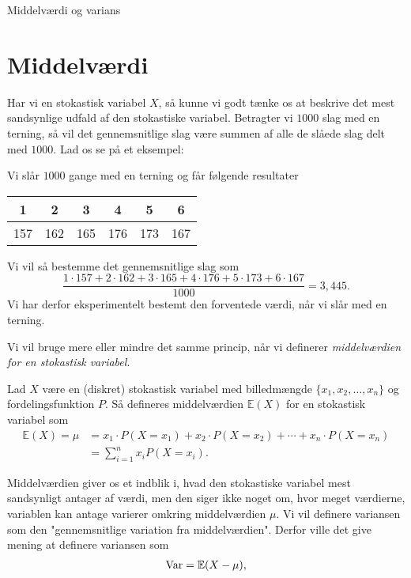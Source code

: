 
\begin{center}
\Huge
Middelværdi og varians
\end{center}

\section*{Middelværdi}

Har vi en stokastisk variabel $X$, så kunne vi godt tænke os at beskrive det mest sandsynlige udfald af den stokastiske variabel. Betragter vi $1000$ slag med en terning, så vil det gennemsnitlige slag være summen af alle de slåede slag delt med $1000$. Lad os se på et eksempel:
\begin{exa}
Vi slår $1000$ gange med en terning og får følgende resultater
\begin{center}
\begin{tabular}{c|c|c|c|c|c}
1 & 2 & 3 & 4 & 5 & 6 \\
\hline 
157& 162& 165& 176& 173& 167
\end{tabular}
\end{center}
Vi vil så bestemme det gennemsnitlige slag som
\[
\frac{1\cdot 157 + 2\cdot 162 + 3\cdot 165 + 4 \cdot 176 + 5\cdot 173 + 6\cdot 167}{1000} = 3,445.
\]
Vi har derfor eksperimentelt bestemt den forventede værdi, når vi slår med en terning. 
\end{exa}
Vi vil bruge mere eller mindre det samme princip, når vi definerer \textit{middelværdien for en stokastisk variabel}.
\begin{defn}[Middelværdi]
Lad $X$ være en (diskret) stokastisk variabel med billedmængde $\{x_1,x_2,\hdots,x_n\}$ og fordelingsfunktion $P$. Så defineres middelværdien $\mathbb{E}(X)$ for en stokastisk variabel som
\begin{align*}
\mathbb{E}(X) = \mu &= x_1 \cdot P(X = x_1) + x_2 \cdot P(X=x_2) + \cdots + x_n \cdot P(X=x_n)\\
&= \sum_{i=1}^{n} x_i P(X=x_i).
\end{align*} 
\end{defn}
Middelværdien giver os et indblik i, hvad den stokastiske variabel mest sandsynligt antager af værdi, men den siger ikke noget om, hvor meget værdierne, variablen kan antage varierer omkring middelværdien $\mu$. Vi vil definere variansen som den "gennemsnitlige variation fra middelværdien". Derfor ville det give mening at definere variansen som 
\begin{align*}
\textnormal{Var} = \mathbb{E}(X-\mu), 
\end{align*}
